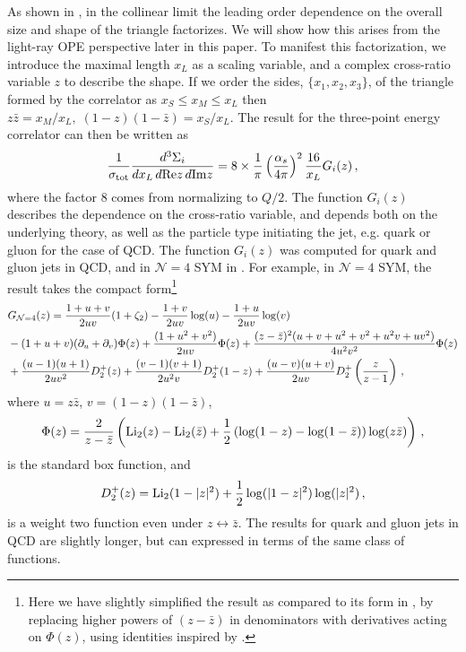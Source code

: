 \documentclass[letterpaper,11pt]{article}
\def\beq{\begin{equation}}
\def\eeq{\end{equation}}
\def\cN{\mathcal{N}}
\def\nn{{\nonumber}}
\def\beq{\begin{equation}}
\def\eeq{\end{equation}}
\begin{document}
As shown in \cite{Chen:2020adz}, in the collinear limit the leading order dependence on the overall size and shape of the triangle factorizes. We will show how this arises from the light-ray OPE perspective later in this paper. To manifest this factorization, we introduce the maximal length $x_L$ as a scaling variable, and a complex cross-ratio variable $z$ to describe the shape. If we order the sides, $\{x_1,x_2,x_3\}$, of the triangle formed by the correlator as $x_S\leq x_M\leq x_L$ then $z\bar{z}=x_M/x_L,\;(1-z)(1-\bar{z})=x_S/x_L$. The result for the three-point energy correlator can then be written as
\beq\label{eq:three_point_general}
\frac{1}{\sigma_{\rm tot}}\frac{d^3\Sigma_{i}}{dx_L \, d \mathrm{Re}{z}\, d\mathrm{Im}{z}}=8\times\frac{1}{\pi} \left(\frac{\alpha_s}{4\pi}\right)^2  \frac{16}{x_L} G_{i}(z)\,,
\eeq
where the factor $8$ comes from normalizing to $Q/2$.
The function $G_i(z)$ describes the dependence on the cross-ratio variable, and depends both on the underlying theory, as well as the particle type initiating the jet, e.g. quark or gluon for the case of QCD. The function $G_i(z)$ was computed for quark and gluon jets in QCD, and in $\cN=4$ SYM in \cite{Chen:2019bpb}. For example, in $\cN=4$ SYM, the result takes the compact form\footnote{Here we have slightly simplified the result as compared to its form in \cite{Chen:2019bpb}, by replacing higher powers of $(z-\bar z)$ in denominators with derivatives acting on $\Phi(z)$, using identities inspired by \cite{Chicherin:2020azt}.}
\begin{align}\label{eq:three_point_N4}
&G_{\cN=4}(z)=\frac{1+u+v}{2uv}(1+\zeta_2)-\frac{1+v}{2uv}\log(u)-\frac{1+u}{2uv}\log(v)\nn \\
&-(1+u+v)(\partial_u +\partial_v)\Phi(z)+\frac{(1+u^2+v^2)}{2uv}\Phi(z) +\frac{(z-\bar z)^2(u+v+u^2+v^2+u^2v+uv^2)}{4u^2 v^2}\Phi(z)\nn \\
&+\frac{(u-1)(u+1)}{2u v^2}D_2^+(z) +\frac{(v-1)(v+1)}{2u^2 v}D_2^+(1-z)+\frac{(u-v)(u+v)}{2uv}D_2^+\left( \frac{z}{z-1} \right)\,,
\end{align}
where $u=z\bar z$, $v=(1-z)(1-\bar z)$,
\begin{align}
  \label{eq:1}
  \Phi(z) =\frac{2}{z-\bar z} \left(  {\rm Li}_2(z) - {\rm Li}_2(\bar z) + \frac{1}{2} \left(\log(1-z) - \log(1 - \bar z) \right) \log (z \bar z) \right)\,,
\end{align}
is the standard box function, and
\begin{align}
  \label{eq:2}
  D_2^+(z) = {\rm Li}_2(1 - |z|^2) + \frac{1}{2} \log(|1-z|^2) \log(|z|^2)\,,
\end{align}
is a weight two function even under $z \leftrightarrow \bar z$. The results for quark and gluon jets in QCD are slightly longer, but can expressed in terms of the same class of functions.
\end{document}
